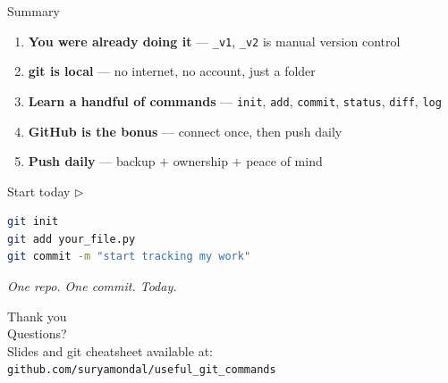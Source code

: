 \documentclass[aspectratio=169]{beamer}
\begin{document}
\begin{frame}[fragile]{Summary}
    \begin{enumerate}
        \setlength\itemsep{0.4em}
        \item \textbf{You were already doing it} ---
              \texttt{\_v1}, \texttt{\_v2} is manual version control
        \item \textbf{git is local} ---
              no internet, no account, just a folder
        \item \textbf{Learn a handful of commands} ---
              \texttt{init}, \texttt{add}, \texttt{commit}, \texttt{status}, \texttt{diff}, \texttt{log}
        \item \textbf{GitHub is the bonus} ---
              connect once, then push daily
        \item \textbf{Push daily} ---
              backup $+$ ownership $+$ peace of mind
    \end{enumerate}
    \vspace{0.8em}
    \pause
    \begin{block}{Start today $\triangleright$}
        \begin{lstlisting}[language=bash]
git init
git add your_file.py
git commit -m "start tracking my work"
        \end{lstlisting}
    \end{block}
    \centering
    \vspace{0.3em}
    \textit{One repo. One commit. Today.}
\end{frame}


\begin{frame}{}
    \centering
    \vspace{2em}
    {\Large Thank you}\\
    \vspace{2em}
    {\large Questions?}\\
    \vspace{2em}
    \small
    Slides and git cheatsheet available at:\\[4pt]
    \texttt{github.com/suryamondal/useful\_git\_commands}
\end{frame}
\end{document}
